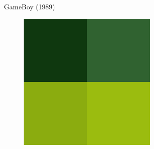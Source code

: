 \documentclass{beamer}
\begin{document}
\begin{darkframes}
\begin{frame}{GameBoy (1989)}
\begin{multicols}{2}
\begin{figure}[h!]
            \end{figure}
            \begin{figure}[h!]
                \centering
                \includegraphics[height=.2\textheight]{gb_palette}
            \end{figure}
        \end{multicols}
    \end{frame}


\end{darkframes}
\end{document}

